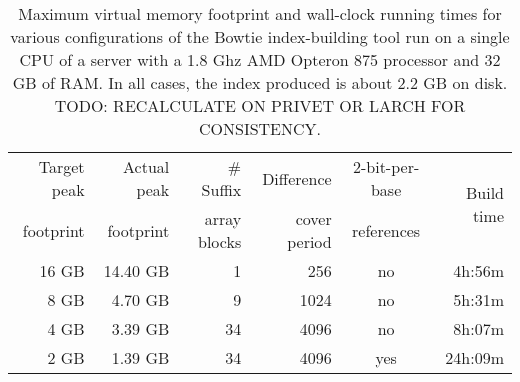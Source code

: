 \documentclass[letterpaper]{article}
\begin{document}
\begin{table}[tp]
\scriptsize
\begin{tabular}{rrrrcr}\toprule
Target peak & Actual peak & \# Suffix   & Difference   & 2-bit-per-base & \multirow{2}{*}{Build time} \\
footprint   & footprint   & array blocks & cover period & references     & \\ 
\toprule
16 GB & 14.40 GB & 1
 & 256
 & no & 4h:56m \\\midrule
8 GB & 4.70 GB & 9
 & 1024
 & no & 5h:31m \\\midrule
4 GB & 3.39 GB & 34
 & 4096
 & no & 8h:07m \\\midrule
2 GB & 1.39 GB & 34
 & 4096
 & yes & 24h:09m \\
\bottomrule
\end{tabular}
\caption{Maximum virtual memory footprint and wall-clock running times for various configurations of the Bowtie index-building tool run on a single CPU of a server with a 1.8 Ghz AMD Opteron 875 processor and 32 GB of RAM. In all cases, the index produced is about 2.2 GB on disk. TODO: RECALCULATE ON PRIVET OR LARCH FOR CONSISTENCY.}
\end{table}
\end{document}
